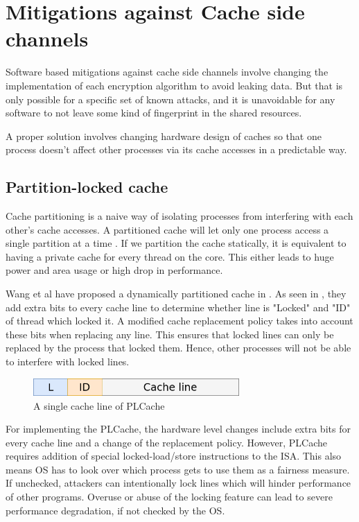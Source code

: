 \chapter{Mitigations against Cache side channels}

Software based mitigations against cache side channels involve changing the
implementation of each encryption algorithm to avoid leaking data. But that is only
possible for a specific set of known attacks, and it is unavoidable for any software
to not leave some kind of fingerprint in the shared resources.

A proper solution involves changing hardware design of caches so that one process
doesn't affect other processes via its cache accesses in a predictable way.

\section{Partition-locked cache}

Cache partitioning is a naive way of isolating processes from interfering with
each other's cache accesses.
A partitioned cache will let only one process access a single partition at a
time .
If we partition the cache statically, it is equivalent to having a private
cache for every thread on the core.
This either leads to huge power and area usage or high drop in performance.

Wang et al have proposed a dynamically partitioned cache in . As seen in ,
they add extra bits to every cache line to determine whether line is "Locked"
and "ID" of thread which locked it.
A modified cache replacement policy takes into account these bits when
replacing any line.
This ensures that locked lines can only be replaced by the process that locked
them. Hence, other processes will not be able to interfere with locked lines.

\begin{figure}
    \centering
    \includegraphics[width=0.7\textwidth]{figures/pl-cache}
    \caption{A single cache line of PLCache}
    \label{fig:plcache}
\end{figure}

For implementing the PLCache, the hardware level changes include extra bits
for every cache line and a change of the replacement policy.
However, PLCache requires addition of special locked-load/store instructions to the ISA.
This also means OS has to look over which process gets to use them as a fairness measure.
If unchecked, attackers can intentionally lock lines which will hinder
performance of other programs.
Overuse or abuse of the locking feature can lead to severe performance
degradation, if not checked by the OS.

